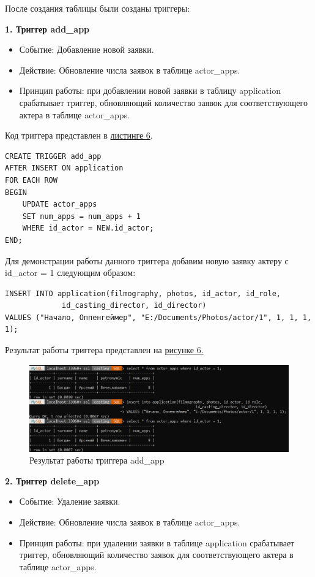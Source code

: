 \documentclass[11pt,a4paper,final]{article} %
\begin{document}
После создания таблицы были созданы триггеры: 

\textbf{1. Триггер add\_app}
\begin{itemize}
	\item Событие: Добавление новой заявки.
	\item Действие: Обновление числа заявок в таблице actor\_apps.
	\item Принцип работы: при добавлении новой заявки в таблицу application срабатывает триггер, обновляющий количество заявок для соответствующего актера в таблице actor\_apps.
\end{itemize}


Код триггера представлен в \hyperref[lst:l6]{листинге 6}.

\begin{lstlisting}[caption={Код триггера add\_app}, label=lst:l6]
CREATE TRIGGER add_app
AFTER INSERT ON application
FOR EACH ROW
BEGIN
	UPDATE actor_apps
	SET num_apps = num_apps + 1
	WHERE id_actor = NEW.id_actor;
END;
\end{lstlisting}


Для демонстрации работы данного триггера добавим новую заявку актеру с id\_actor = 1 следующим образом:

\begin{lstlisting}
INSERT INTO application(filmography, photos, id_actor, id_role, 
			 id_casting_director, id_director) 
VALUES ("Начало, Оппенгеймер", "E:/Documents/Photos/actor/1", 1, 1, 1, 1); 
\end{lstlisting}


Результат работы триггера представлен на \hyperref[fig:pic6]{рисунке 6.}

\begin{figure}[H]
	\centering
	\includegraphics[width=1.0\linewidth]{pic6.png}
	\caption{Результат работы триггера add\_app}
	\label{fig:pic6}
\end{figure}





\textbf{2. Триггер delete\_app}
\begin{itemize}
	\item Событие: Удаление заявки.
	\item Действие: Обновление числа заявок в таблице actor\_apps.
	\item Принцип работы: при удалении заявки в таблице application срабатывает триггер, обновляющий количество заявок для соответствующего актера в таблице actor\_apps.
\end{itemize}
\end{document}
